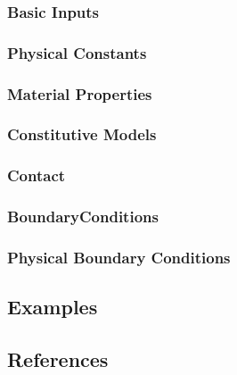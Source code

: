 \subsubsection{Basic Inputs}
\subsubsection{Physical Constants}
\subsubsection{Material Properties}
\subsubsection{Constitutive Models}
\subsubsection{Contact}
\subsubsection{BoundaryConditions}
\subsubsection{Physical Boundary Conditions}

\subsection{Examples}

\subsection{References}
